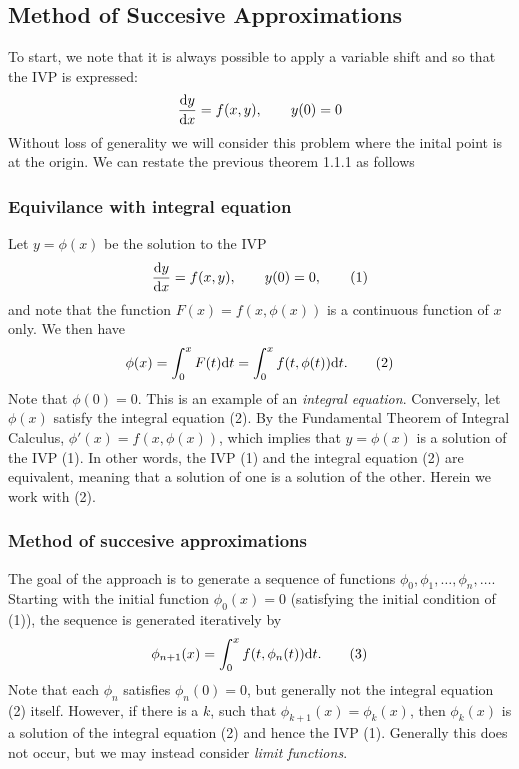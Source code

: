 \documentclass{report}
\begin{document}
\subsection{Method of Succesive Approximations}
To start, we note that it is always possible to apply a variable shift and so that the IVP is expressed:
$$
  \frac{\mathrm{d} y}{\mathrm{d} x} = f(x,y),\qquad y(0)=0
$$
Without loss of generality we will consider this problem where the inital point is at the origin. We can restate the previous theorem 1.1.1 as follows

\subsubsection*{Equivilance with integral equation}
Let $y=\phi(x)$ be the solution to the IVP 
\[
  \frac{\mathrm{d} y}{\mathrm{d} x}=f(x,y),\qquad y(0)=0, \tag*{(1)}
\]
and note that the function $F(x) = f(x,\phi(x))$ is a continuous function of $x$ only. We then have
\[
  \phi(x) = \int_{0}^{x} F(t)\mathrm{d} t = \int_{0}^{x} f(t,\phi(t))\mathrm{d} t. \tag*{(2)}
\]
Note that $\phi(0)=0$. This is an example of an \textit{integral equation}. Conversely, let $\phi(x)$ satisfy the integral equation (2). By the Fundamental Theorem of Integral Calculus, $\phi'(x) = f (x, \phi(x))$, which implies that $y = \phi(x)$ is a solution of the IVP (1). In other words, the IVP (1) and the integral equation (2) are equivalent, meaning that a solution of one is a solution of the other. Herein we work with (2).

\subsubsection*{Method of succesive approximations}
The goal of the approach is to generate a sequence of functions ${\phi_0, \phi_1, \dots, \phi_n, \dots}$. Starting with the initial function $\phi_0(x) = 0$ (satisfying the initial condition of (1)), the sequence is generated iteratively by
\[
  \phi_{n+1}(x) = \int_{0}^{x} f(t, \phi_n(t))\mathrm{d} t. \tag*{(3)}
\]
Note that each $\phi_n$ satisfies $\phi_n(0) = 0$, but generally not the integral equation (2) itself. However, if there is a $k$, such that $\phi_{k+1}(x) = \phi_k(x)$, then $\phi_k(x)$ is a solution of the integral equation (2) and hence the IVP (1). Generally this does not occur, but we may instead consider \textit{limit functions}. \\
\end{document}

